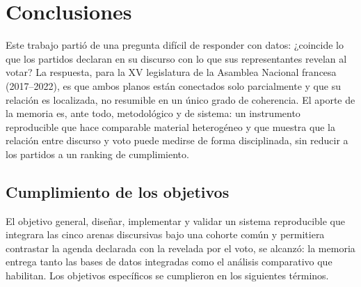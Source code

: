 \chapter{Conclusiones}
\label{cap:conclusiones}


Este trabajo partió de una pregunta difícil de responder con datos: ¿coincide lo
que los partidos declaran en su discurso con lo que sus representantes revelan al
votar? La respuesta, para la XV legislatura de la Asamblea Nacional francesa
(2017--2022), es que ambos planos están conectados solo parcialmente y que su
relación es localizada, no resumible en un único grado de coherencia. El aporte
de la memoria es, ante todo, metodológico y de sistema: un instrumento
reproducible que hace comparable material heterogéneo y que muestra que la
relación entre discurso y voto puede medirse de forma disciplinada, sin reducir a
los partidos a un ranking de cumplimiento.

\section{Cumplimiento de los objetivos}
\label{sec:concl-objetivos}

El objetivo general, diseñar, implementar y validar un sistema reproducible que
integrara las cinco arenas discursivas bajo una cohorte común y permitiera
contrastar la agenda declarada con la revelada por el voto, se alcanzó: la
memoria entrega tanto las bases de datos integradas como el análisis comparativo
que habilitan. Los objetivos específicos se cumplieron en los siguientes
términos.

